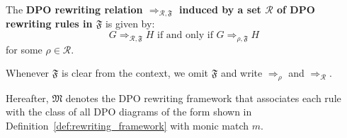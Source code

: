 \begin{definition}
    The \textbf{DPO rewriting relation $\mathop{\Rightarrow}_{\mathcal{R},\mathfrak{F}}$ induced by a set $\mathcal{R}$ of DPO rewriting rules in $\mathfrak{F}$} is given by: 
     $$G \mathop{\Rightarrow}_{\mathcal{R},\mathfrak{F}} H\text{ if and only if }G \mathop{\Rightarrow}_{\rho,\mathfrak{F}} H$$ for some $\rho \mathop{\in} \mathcal{R}$. 
     
     Whenever $\mathfrak{F}$ is clear from the context, we 
    omit $\mathfrak{F}$ and 
    write $\mathop{\Rightarrow}_{\rho}$ and $\mathop{\Rightarrow}_{\mathcal{R}}$.
  \end{definition}
Hereafter, \(\mathfrak{M}\) denotes the DPO rewriting framework that associates each rule with the class of all DPO diagrams of the form shown in Definition~\ref{def:rewriting_framework} with monic match $m$.
